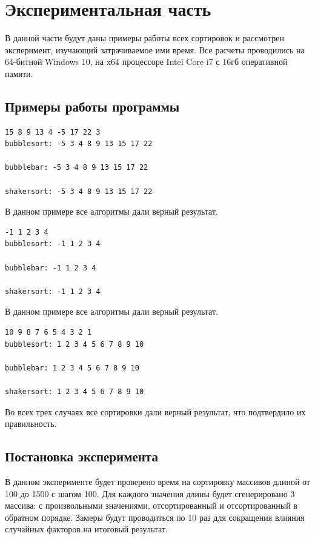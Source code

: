 \documentclass[a4paper, 14pt]{article}
\begin{document}
        \section{Экспериментальная часть}
        В данной части будут даны примеры работы всех сортировок и рассмотрен эксперимент, изучающий затрачиваемое ими время. Все расчеты проводились на 64-битной Windows 10, на x64 процессоре Intel Core i7 с 16гб оперативной памяти.
        \subsection{Примеры работы программы}
		\begin{lstlisting}[label=some-code,caption=Пример работы 1]        
15 8 9 13 4 -5 17 22 3 
bubblesort: -5 3 4 8 9 13 15 17 22 

bubblebar: -5 3 4 8 9 13 15 17 22 

shakersort: -5 3 4 8 9 13 15 17 22 

		\end{lstlisting}
		В данном примере все алгоритмы дали верный результат.
		\begin{lstlisting}[label=some-code,caption=Пример работы 2]		
-1 1 2 3 4 
bubblesort: -1 1 2 3 4 

bubblebar: -1 1 2 3 4 

shakersort: -1 1 2 3 4 

		\end{lstlisting}
		В данном примере все алгоритмы дали верный результат.
		\begin{lstlisting}[label=some-code,caption=Пример работы 3]		
10 9 8 7 6 5 4 3 2 1 
bubblesort: 1 2 3 4 5 6 7 8 9 10 

bubblebar: 1 2 3 4 5 6 7 8 9 10 

shakersort: 1 2 3 4 5 6 7 8 9 10 
		\end{lstlisting}
		Во всех трех случаях все сортировки дали верный результат, что подтвердило их правильность.
		
		\subsection{Постановка эксперимента}
		\parindent=1cm
		В данном эксперименте будет проверено время на сортировку массивов длиной от 100 до 1500 с шагом 100. Для каждого значения длины будет сгенерировано 3 массива: с произвольными значениями, отсортированный и отсортированный в обратном порядке. Замеры будут проводиться по 10 раз для сокращения влияния случайных факторов на итоговый результат. 
\end{document}
